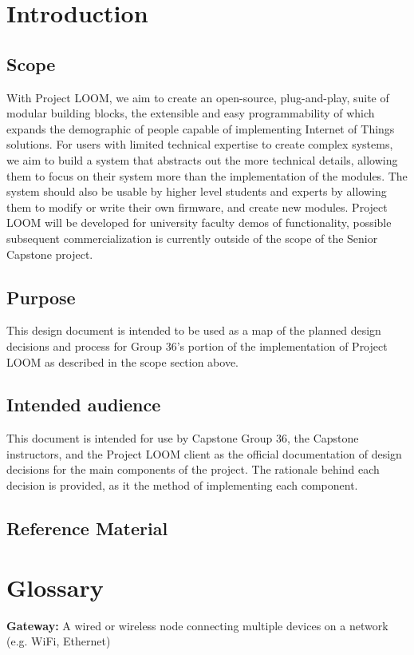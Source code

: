 \documentclass[onecolumn, draftclsnofoot,10pt, compsoc]{IEEEtran}
\begin{document}
\section{Introduction}
\subsection{Scope}  
With Project LOOM, we aim to create an open-source, plug-and-play, suite of modular building blocks, the extensible and easy programmability of which expands the demographic of people capable of implementing Internet of Things solutions. For users with limited technical expertise to create complex systems, we aim to build a system that abstracts out the more technical details, allowing them to focus on their system more than the implementation of the modules. The system should also be usable by higher level students and experts by allowing them to modify or write their own firmware, and create new modules. Project LOOM will be developed for university faculty demos of functionality, possible subsequent commercialization is currently outside of the scope of the Senior Capstone project.

\subsection{Purpose}
This design document is intended to be used as a map of the planned design decisions and process for Group 36's portion of the implementation of Project LOOM as described in the scope section above.
                
\subsection{Intended audience}
This document is intended for use by Capstone Group 36, the Capstone instructors, and the Project LOOM client as the official documentation of design decisions for the main components of the project. The rationale behind each decision is provided, as it the method of implementing each component.

\subsection{Reference Material}
    \renewcommand{\listfigurename}{}
    \vspace{-40pt}
    \listoffigures

\section{Glossary}
    \textbf{Gateway:} A wired or wireless node connecting multiple devices on a network (e.g. WiFi, Ethernet)
\end{document}
